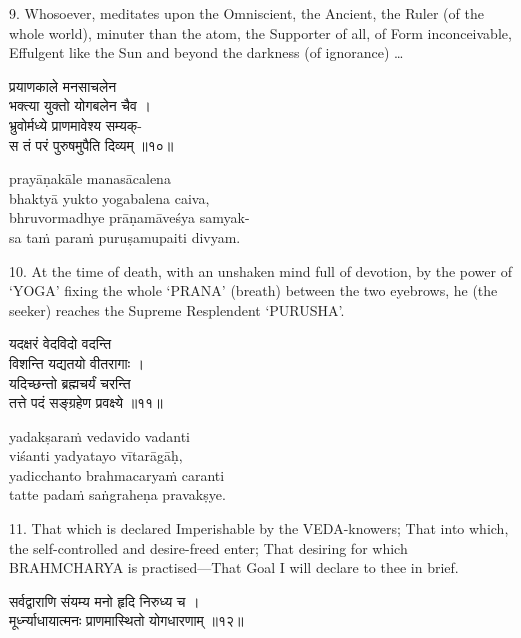 9. Whosoever, meditates upon the Omniscient, the Ancient, the Ruler (of the
whole world), minuter than the atom, the Supporter of all, of Form
inconceivable, Effulgent like the Sun and beyond the darkness (of ignorance)
\ldots

\begin{gitaverse}
प्रयाणकाले मनसाचलेन \\
\tab भक्त्या युक्तो योगबलेन चैव । \\
भ्रुवोर्मध्ये प्राणमावेश्य सम्यक्- \\
\tab स तं परं पुरुषमुपैति दिव्यम् ॥१०॥
\end{gitaverse}

\begin{transliteration}
prayāṇakāle manasācalena \\
\tab bhaktyā yukto yogabalena caiva, \\
bhruvormadhye prāṇamāveśya samyak- \\
\tab sa taṁ paraṁ puruṣamupaiti divyam.
\end{transliteration}

10. At the time of death, with an unshaken mind full of devotion, by the power
of `YOGA' fixing the whole `PRANA' (breath) between the two eyebrows, he (the
seeker) reaches the Supreme Resplendent `PURUSHA'.

\begin{gitaverse}
यदक्षरं वेदविदो वदन्ति \\
\tab विशन्ति यद्यतयो वीतरागाः । \\
यदिच्छन्तो ब्रह्मचर्यं चरन्ति \\
\tab तत्ते पदं सङ्ग्रहेण प्रवक्ष्ये ॥११॥
\end{gitaverse}

\begin{transliteration}
yadakṣaraṁ vedavido vadanti \\
\tab viśanti yadyatayo vītarāgāḥ, \\
yadicchanto brahmacaryaṁ caranti \\
\tab tatte padaṁ saṅgraheṇa pravakṣye.
\end{transliteration}

11. That which is declared Imperishable by the VEDA-knowers; That into which,
the self-controlled and desire-freed enter; That desiring for which BRAHMCHARYA
is practised---That Goal I will declare to thee in brief.

\begin{gitaverse}
सर्वद्वाराणि संयम्य मनो हृदि निरुध्य च । \\
मूर्ध्न्याधायात्मनः प्राणमास्थितो योगधारणाम् ॥१२॥
\end{gitaverse}

